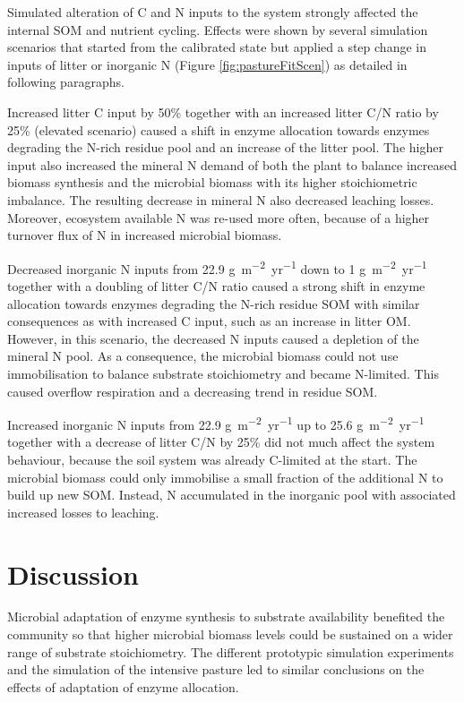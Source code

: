 Simulated alteration of C and N inputs to the system strongly affected the
internal SOM and nutrient cycling. Effects were shown by several
simulation scenarios that started from the calibrated state but applied a step change in
inputs of litter or inorganic N (Figure \ref{fig:pastureFitScen}) as detailed
in following paragraphs.

Increased litter C input by 50\% together with an increased litter C/N ratio by
25\% (elevated  scenario) caused a shift in enzyme allocation towards
enzymes degrading the N-rich residue pool and an increase of the litter pool.
The higher input also increased the mineral N demand of both the plant to
balance increased biomass synthesis and the microbial biomass with its higher
stoichiometric imbalance. The resulting decrease in mineral N also decreased
leaching losses. Moreover, ecosystem available N was re-used more often, because
of a higher turnover flux of N in increased microbial biomass.

Decreased inorganic N inputs from 22.9
\unit{g~m^{-2}yr^{-1}} down to 1
\unit{g~m^{-2}yr^{-1}} together with a doubling of litter C/N
ratio caused a strong shift in enzyme allocation towards enzymes degrading the
N-rich residue SOM with similar consequences as with increased C input,
such as an increase in litter OM. However, in this scenario, the decreased N inputs caused
a depletion of the mineral N pool.
As a consequence, the microbial biomass could not use immobilisation to
balance substrate stoichiometry and became N-limited.
This caused overflow respiration and a decreasing trend in residue SOM.

Increased inorganic N inputs from 22.9 \unit{g~m^{-2}yr^{-1}} up to 25.6
\unit{g~m^{-2}yr^{-1}} together with a decrease of litter C/N by 25\% did not
much affect the system behaviour, because the soil system was already C-limited
at the start. The microbial biomass could only immobilise a small fraction of the additional N to build 
up new SOM. Instead, N accumulated in the inorganic pool with associated
increased losses to leaching.

\section{Discussion}
Microbial adaptation of enzyme synthesis to substrate availability benefited the
community so that higher microbial biomass levels could be sustained on a wider
range of substrate stoichiometry.
The different prototypic simulation experiments and the simulation of the
intensive pasture led to similar conclusions on the effects of adaptation of
enzyme allocation.

